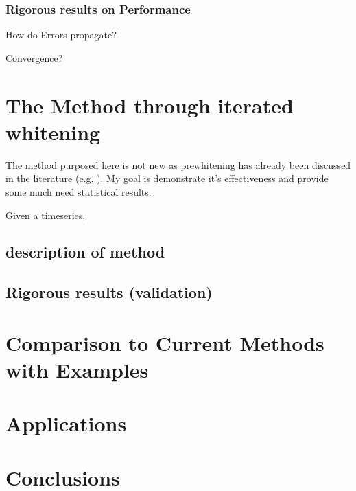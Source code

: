 \documentclass[12pt]{amsart}
\begin{document}
\subsubsection{Rigorous results on Performance}
How do Errors propagate?

Convergence?

\section{The Method through iterated whitening}
The method purposed here is not new as prewhitening has already been discussed in the literature (e.g. \cite[Sec.~7.4.1]{priestley1981spectral}). My goal is demonstrate it's effectiveness and provide some much need statistical results. 

Given a timeseries,   




\subsection{description of method}
\subsection{Rigorous results (validation)}

\section{Comparison to Current Methods with Examples}

\section{Applications}

\section{Conclusions}

\appendix





\end{document}
